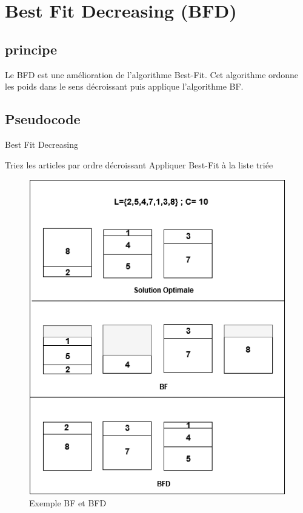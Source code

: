 \documentclass[class=article, crop=false]{standalone}
\begin{document}
\section{Best Fit Decreasing (BFD)}
\subsection{principe}
Le BFD est une amélioration de l’algorithme Best-Fit. Cet algorithme ordonne les poids dans le sens décroissant puis applique l’algorithme BF.

\subsection{Pseudocode}

\begin{algorithm}[!h]
    \caption{Best Fit Decreasing }
    \begin{algorithmic}
        \STATE Triez les articles par ordre décroissant
        \STATE Appliquer Best-Fit à la liste triée 
    \end{algorithmic}
\end{algorithm}


\begin{figure}[H]
    \includegraphics[width=\linewidth]{../figures/BF BFD.png}
    \caption{Exemple BF et BFD}
\end{figure}
\newpage
\end{document}
